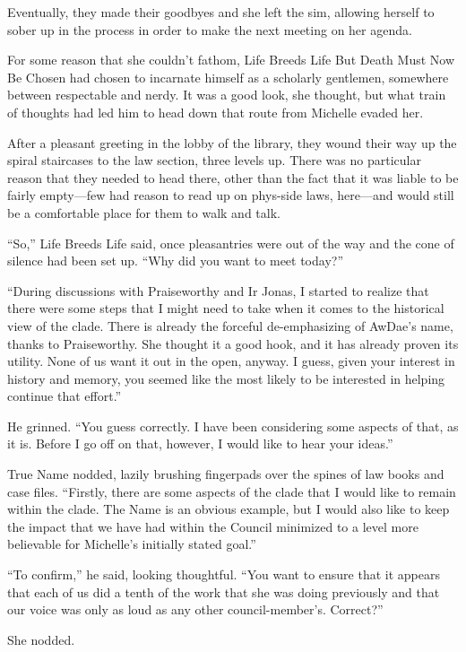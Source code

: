Eventually, they made their goodbyes and she left the sim, allowing herself to sober up in the process in order to make the next meeting on her agenda.

For some reason that she couldn't fathom, Life Breeds Life But Death Must Now Be Chosen had chosen to incarnate himself as a scholarly gentlemen, somewhere between respectable and nerdy. It was a good look, she thought, but what train of thoughts had led him to head down that route from Michelle evaded her.

After a pleasant greeting in the lobby of the library, they wound their way up the spiral staircases to the law section, three levels up. There was no particular reason that they needed to head there, other than the fact that it was liable to be fairly empty---few had reason to read up on phys-side laws, here---and would still be a comfortable place for them to walk and talk.

``So,'' Life Breeds Life said, once pleasantries were out of the way and the cone of silence had been set up. ``Why did you want to meet today?''

``During discussions with Praiseworthy and Ir Jonas, I started to realize that there were some steps that I might need to take when it comes to the historical view of the clade. There is already the forceful de-emphasizing of AwDae's name, thanks to Praiseworthy. She thought it a good hook, and it has already proven its utility. None of us want it out in the open, anyway. I guess, given your interest in history and memory, you seemed like the most likely to be interested in helping continue that effort.''

He grinned. ``You guess correctly. I have been considering some aspects of that, as it is. Before I go off on that, however, I would like to hear your ideas.''

True Name nodded, lazily brushing fingerpads over the spines of law books and case files. ``Firstly, there are some aspects of the clade that I would like to remain within the clade. The Name is an obvious example, but I would also like to keep the impact that we have had within the Council minimized to a level more believable for Michelle's initially stated goal.''

``To confirm,'' he said, looking thoughtful. ``You want to ensure that it appears that each of us did a tenth of the work that she was doing previously and that our voice was only as loud as any other council-member's. Correct?''

She nodded.

